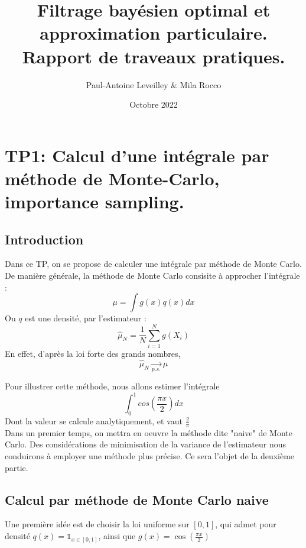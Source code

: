 \documentclass{article}
\title{Filtrage bayésien optimal et approximation particulaire. Rapport de traveaux pratiques.}
\author{Paul-Antoine Leveilley \& Mila Rocco}
\date{Octobre 2022}
\begin{document}
\maketitle

\newpage
\tableofcontents
\newpage
\listoffigures
\newpage
\section{TP1: Calcul d'une intégrale par méthode de Monte-Carlo, importance sampling.}
\subsection{Introduction}
Dans ce TP, on se propose de calculer une intégrale par méthode de Monte Carlo. De manière générale, la méthode de Monte Carlo
consisite à approcher l'intégrale : 
\[\mu = \int g(x)q(x)dx\] 
Ou $q$ est une densité, par l'estimateur : 
\begin{equation}
  \label{estim}
  \hat{\mu}_N = \frac{1}{N} \sum_{i=1}^N g(X_i)
\end{equation}
En effet, d'après la loi forte des grands nombres, 
\[\hat{\mu}_N\underset{p.s.}{\longrightarrow}\mu \] 

Pour illustrer cette méthode, nous allons estimer l'intégrale 
\[\int_0^1 cos(\frac{\pi x}{2})dx\]
Dont la valeur se calcule analytiquement, et vaut $\frac{2}{\pi}$ \\
Dans un premier temps, on mettra en oeuvre la méthode dite "naive" de Monte Carlo. Des considérations de minimisation de
la variance de l'estimateur nous conduirons à employer une méthode
plus précise. Ce sera l'objet de la deuxième partie.\\ 

 \subsection{Calcul par méthode de Monte Carlo naive}
Une première idée est de choisir la loi uniforme sur $[0,1]$, qui admet pour densité $q(x) = \mathbb{1}_{x \in [0,1]}$, ainsi que $g(x) = \cos (\frac{\pi x}{2})$
\end{document}
